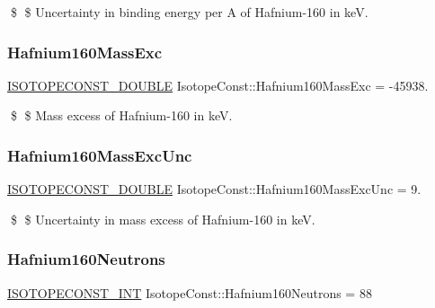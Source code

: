 \$ \$ Uncertainty in binding energy per A of Hafnium-\/160 in keV. \mbox{\label{group___isotope_const-_hafnium-_hf160_ga90bb89f48fc66e9d5ac3035548c30459}} 
\subsubsection{\texorpdfstring{Hafnium160\+Mass\+Exc}{Hafnium160MassExc}}
{\footnotesize\ttfamily \mbox{\hyperlink{group___isotope_const-_macros_ga8f45a7272ce02c0b4c65c44636ed719a}{I\+S\+O\+T\+O\+P\+E\+C\+O\+N\+S\+T\+\_\+\+D\+O\+U\+B\+LE}} Isotope\+Const\+::\+Hafnium160\+Mass\+Exc = -\/45938.}

\$ \$ Mass excess of Hafnium-\/160 in keV. \mbox{\label{group___isotope_const-_hafnium-_hf160_ga50e5a0589cf52b36af35de37b87ebcdf}} 
\subsubsection{\texorpdfstring{Hafnium160\+Mass\+Exc\+Unc}{Hafnium160MassExcUnc}}
{\footnotesize\ttfamily \mbox{\hyperlink{group___isotope_const-_macros_ga8f45a7272ce02c0b4c65c44636ed719a}{I\+S\+O\+T\+O\+P\+E\+C\+O\+N\+S\+T\+\_\+\+D\+O\+U\+B\+LE}} Isotope\+Const\+::\+Hafnium160\+Mass\+Exc\+Unc = 9.}

\$ \$ Uncertainty in mass excess of Hafnium-\/160 in keV. \mbox{\label{group___isotope_const-_hafnium-_hf160_gaf99fdc6fff8b787bc4f9b12d994094ee}} 
\subsubsection{\texorpdfstring{Hafnium160\+Neutrons}{Hafnium160Neutrons}}
{\footnotesize\ttfamily \mbox{\hyperlink{group___isotope_const-_macros_ga5f18360b3e99483a35c32d789e62621c}{I\+S\+O\+T\+O\+P\+E\+C\+O\+N\+S\+T\+\_\+\+I\+NT}} Isotope\+Const\+::\+Hafnium160\+Neutrons = 88}

